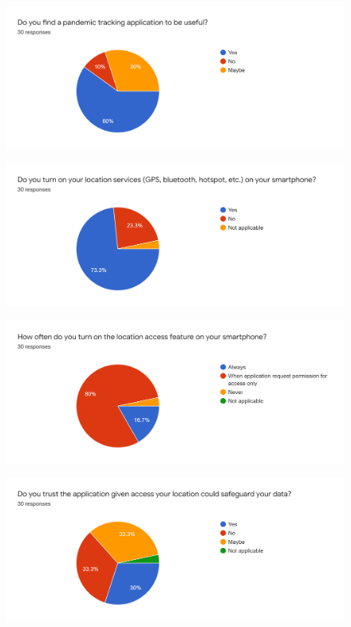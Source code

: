 \begin{appendices}
\begin{figure}[H]
    \end{figure}
    \begin{figure}[H]
      \centering
      \includegraphics[width=18cm]{img/Survey/Q4.png}
    \end{figure}
    \begin{figure}[H]
      \centering
      \includegraphics[width=18cm]{img/Survey/Q5.png}
    \end{figure}
    \begin{figure}[H]
      \centering
      \includegraphics[width=18cm]{img/Survey/Q6.png}
    \end{figure}
    \begin{figure}[H]
      \centering
      \includegraphics[width=18cm]{img/Survey/Q7.png}

\end{figure}
\end{appendices}
